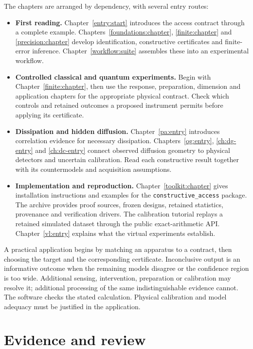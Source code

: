 \documentclass[11pt,oneside]{book}
\theoremstyle{definition}
\theoremstyle{remark}
\begin{document}
The chapters are arranged by dependency, with several entry routes:
\begin{itemize}[leftmargin=1.5em]
\item \textbf{First reading.}
Chapter~\ref{entry:start} introduces the access contract through a complete
example. Chapters~\ref{foundations:chapter}, \ref{finite:chapter} and
\ref{precision:chapter} develop identification, constructive certificates
and finite-error inference. Chapter~\ref{workflow:suite} assembles these
into an experimental workflow.
\item \textbf{Controlled classical and quantum experiments.}
Begin with Chapter~\ref{finite:chapter}, then use the response, preparation,
dimension and application chapters for the appropriate physical contract.
Check which controls and retained outcomes a proposed instrument permits
before applying its certificate.
\item \textbf{Dissipation and hidden diffusion.}
Chapter~\ref{pa:entry} introduces correlation evidence for necessary
dissipation. Chapters~\ref{og:entry}, \ref{ch:dg-entry} and
\ref{ch:dc-entry} connect observed diffusion geometry to physical detectors
and uncertain calibration. Read each constructive result together with its
countermodels and acquisition assumptions.
\item \textbf{Implementation and reproduction.}
Chapter~\ref{toolkit:chapter} gives installation instructions and examples
for the \texttt{constructive\_access} package. The archive provides
proof sources, frozen designs, retained statistics, provenance and verification
drivers. The calibration tutorial replays a retained simulated dataset through
the public exact-arithmetic API. Chapter~\ref{vl:entry} explains what the
virtual experiments establish.
\end{itemize}

A practical application begins by matching an apparatus to a contract, then
choosing the target and the corresponding certificate. Inconclusive output is
an informative outcome when the remaining models disagree or the confidence
region is too wide. Additional sensing, intervention, preparation or calibration
may resolve it; additional processing of the same indistinguishable evidence
cannot. The software checks the stated calculation. Physical calibration and
model adequacy must be justified in the application.

\section*{Evidence and review}
\end{document}
